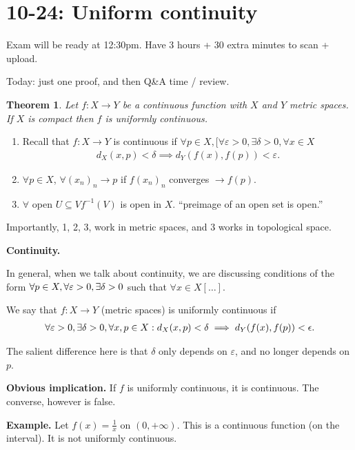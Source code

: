 \documentclass[12pt]{article}
\newtheorem*{theorem}{Theorem}
\newcommand{\eps}{\epsilon}
\begin{document}
\section{10-24: Uniform continuity}

Exam will be ready at 12:30pm.  Have 3 hours + 30 extra minutes to scan + upload.

Today: just one proof, and then Q\&A time / review.

\begin{theorem}
  Let $f: X \to Y$ be a continuous function with $X$ and $Y$ metric spaces.  If $X$ is compact then $f$ is uniformly continuous.
\end{theorem}

\begin{enumerate}
  \item Recall that $f:X \to Y$ is continuous if $\forall p \in X, [\forall \varepsilon > 0, \exists \delta > 0, \forall x \in X$
  \begin{align*}
    d_X(x, p) < \delta \implies d_Y (f(x), f(p)) < \varepsilon.
  \end{align*}
\item $\forall p \in X$, $\forall (x_n)_n \to p$ if $f(x_n)_n$ converges $\to f(p)$.
\item $\forall$ open $U \subseteq V f^{-1}(V)$ is open in $X$. ``preimage of an open set is open.''
\end{enumerate}

Importantly, 1, 2, 3, work in metric spaces, and 3 works in topological space.

{\bf Continuity.}

In general, when we talk about continuity, we are discussing conditions of the form $\forall p \in X, \forall \varepsilon > 0, \exists \delta > 0$ such that $\forall x \in X [\dots]$.

We say that $f: X \to Y$ (metric spaces) is uniformly continuous if
\begin{align*}
  \forall \varepsilon > 0, \exists \dl > 0, \forall x, p \in X: d_X(x, p) < \delta \implies d_{Y}(f(x), f(p)) < \eps.
\end{align*}

The salient difference here is that $\delta$ only depends on $\varepsilon$, and no longer depends on $p$.

{\bf Obvious implication.} If $f$ is uniformly continuous, it is continuous.  The converse, however is false.

{\bf Example.} Let $f(x) = \frac{1}{x}$ on $(0, + \infty)$. This is a continuous function (on the interval).  It is not uniformly continuous.
\end{document}
